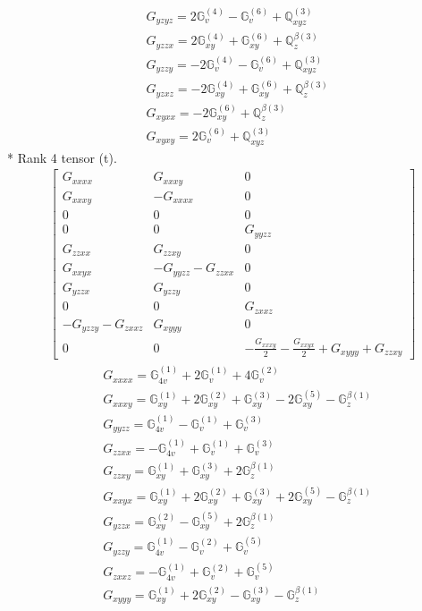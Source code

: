 \documentclass[fleqn,8pt,landscape]{jsarticle}
\begin{document}
\begin{align*}
& G_{yzyz} = 2 \mathbb{G}_{v}^{(4)} - \mathbb{G}_{v}^{(6)} + \mathbb{Q}_{xyz}^{(3)} \\
& G_{yzzx} = 2 \mathbb{G}_{xy}^{(4)} + \mathbb{G}_{xy}^{(6)} + \mathbb{Q}_{z}^{\beta(3)} \\
& G_{yzzy} = - 2 \mathbb{G}_{v}^{(4)} - \mathbb{G}_{v}^{(6)} + \mathbb{Q}_{xyz}^{(3)} \\
& G_{yzxz} = - 2 \mathbb{G}_{xy}^{(4)} + \mathbb{G}_{xy}^{(6)} + \mathbb{Q}_{z}^{\beta(3)} \\
& G_{xyxx} = - 2 \mathbb{G}_{xy}^{(6)} + \mathbb{Q}_{z}^{\beta(3)} \\
& G_{xyxy} = 2 \mathbb{G}_{v}^{(6)} + \mathbb{Q}_{xyz}^{(3)}
\end{align*}
* Rank 4 tensor (t).
\begin{align*}
\begin{bmatrix} G_{xxxx} & G_{xxxy} & 0 \\ G_{xxxy} & - G_{xxxx} & 0 \\ 0 & 0 & 0 \\ 0 & 0 & G_{yyzz} \\ G_{zzxx} & G_{zzxy} & 0 \\ G_{xxyx} & - G_{yyzz} - G_{zzxx} & 0 \\ G_{yzzx} & G_{yzzy} & 0 \\ 0 & 0 & G_{zxxz} \\ - G_{yzzy} - G_{zxxz} & G_{xyyy} & 0 \\ 0 & 0 & - \frac{G_{xxxy}}{2} - \frac{G_{xxyx}}{2} + G_{xyyy} + G_{zzxy} \end{bmatrix}
\end{align*}
\begin{align*}
& G_{xxxx} = \mathbb{G}_{4v}^{(1)} + 2 \mathbb{G}_{v}^{(1)} + 4 \mathbb{G}_{v}^{(2)} \\
& G_{xxxy} = \mathbb{G}_{xy}^{(1)} + 2 \mathbb{G}_{xy}^{(2)} + \mathbb{G}_{xy}^{(3)} - 2 \mathbb{G}_{xy}^{(5)} - \mathbb{G}_{z}^{\beta(1)} \\
& G_{yyzz} = \mathbb{G}_{4v}^{(1)} - \mathbb{G}_{v}^{(1)} + \mathbb{G}_{v}^{(3)} \\
& G_{zzxx} = - \mathbb{G}_{4v}^{(1)} + \mathbb{G}_{v}^{(1)} + \mathbb{G}_{v}^{(3)} \\
& G_{zzxy} = \mathbb{G}_{xy}^{(1)} + \mathbb{G}_{xy}^{(3)} + 2 \mathbb{G}_{z}^{\beta(1)} \\
& G_{xxyx} = \mathbb{G}_{xy}^{(1)} + 2 \mathbb{G}_{xy}^{(2)} + \mathbb{G}_{xy}^{(3)} + 2 \mathbb{G}_{xy}^{(5)} - \mathbb{G}_{z}^{\beta(1)} \\
& G_{yzzx} = \mathbb{G}_{xy}^{(2)} - \mathbb{G}_{xy}^{(5)} + 2 \mathbb{G}_{z}^{\beta(1)} \\
& G_{yzzy} = \mathbb{G}_{4v}^{(1)} - \mathbb{G}_{v}^{(2)} + \mathbb{G}_{v}^{(5)} \\
& G_{zxxz} = - \mathbb{G}_{4v}^{(1)} + \mathbb{G}_{v}^{(2)} + \mathbb{G}_{v}^{(5)} \\
& G_{xyyy} = \mathbb{G}_{xy}^{(1)} + 2 \mathbb{G}_{xy}^{(2)} - \mathbb{G}_{xy}^{(3)} - \mathbb{G}_{z}^{\beta(1)}
\end{align*}
\end{document}
